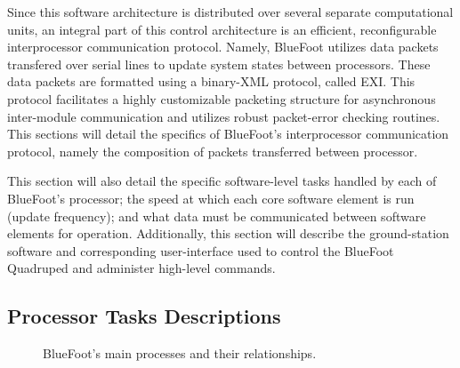 	Since this software architecture is distributed over several separate computational units, an integral part of this control architecture is an efficient, reconfigurable interprocessor communication protocol. Namely, BlueFoot utilizes data packets transfered over serial lines to update system states between processors. These data packets are formatted using a binary-XML protocol, called EXI. This protocol facilitates a highly customizable packeting structure for asynchronous inter-module communication and utilizes robust packet-error checking routines. This sections will detail the specifics of BlueFoot's interprocessor communication protocol, namely the composition of packets transferred between processor. 

	This section will also detail the specific software-level tasks handled by each of BlueFoot's processor; the speed at which each core software element is run (update frequency); and what data must be communicated between software elements for operation. Additionally, this section will describe the ground-station software and corresponding user-interface used to control the BlueFoot Quadruped and administer high-level commands.
	
	\subsection{Processor Tasks Descriptions}

		\begin{figure}[h!]
			\centering
			\caption{BlueFoot's main processes and their relationships.}
			\label{fig::process_diagram}
		\end{figure}

